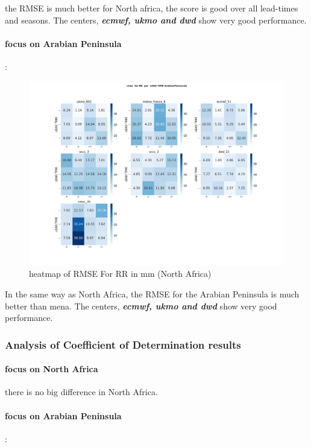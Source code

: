 the RMSE is much better for North africa, the score is good over all lead-times and seasons. The centers, \textbf{\textit{ecmwf, ukmo and dwd}} show very good performance.

\vspace{1.5cm}
\paragraph{focus on Arabian Peninsula}:

\begin{figure}[H]
\centering
\includegraphics[scale=0.3]{plots/det/rmse/rmse_RR_ArabianPeninsula.png}
\caption{heatmap of RMSE For RR in mm (North Africa)}
\end{figure}

In the same way as North Africa, the RMSE for the Arabian Peninsula is much better than mena. The centers, \textbf{\textit{ecmwf, ukmo and dwd}} show very good performance.

\subsubsection{Analysis of Coefficient of Determination results}

\paragraph{focus on North Africa}

there is no big difference in North Africa.


\vspace{1.5cm}
\paragraph{focus on Arabian Peninsula}:


